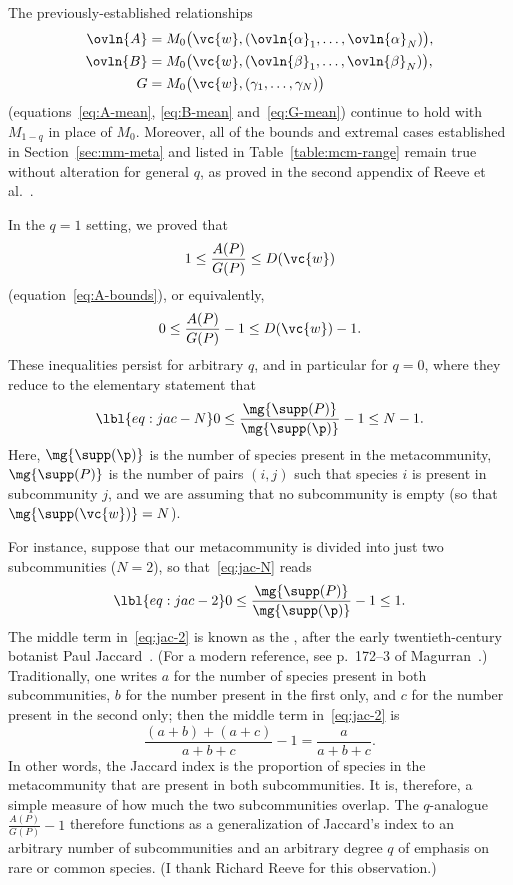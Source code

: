 The previously-established relationships
% 
\begin{align*}
\ovln{A}        &
=
M_0 \bigl( \vc{w}, 
(\ovln{\alpha}_1, \ldots, \ovln{\alpha}_N) 
\bigr),   \\
\ovln{B}        &
=
M_0 \bigl( \vc{w}, 
(\ovln{\beta}_1, \ldots, \ovln{\beta}_N) 
\bigr),     \\
G               &
=
M_0 \bigl( \vc{w}, 
(\gamma_1, \ldots, \gamma_N) 
\bigr)
\end{align*}
% 
(equations~\eqref{eq:A-mean}, \eqref{eq:B-mean} and~\eqref{eq:G-mean})
continue to hold with $M_{1 - q}$ in place of $M_0$.  Moreover, all of the
bounds and extremal cases established in Section~\ref{sec:mm-meta} and
listed in Table~\ref{table:mcm-range} remain true without alteration for
general $q$, as proved in the second appendix of Reeve et al.~\cite{HPD}.

\begin{example}
In the $q = 1$ setting, we proved that
\[
1 \leq \frac{A(P)}{G(P)} \leq D(\vc{w})
\]
(equation~\eqref{eq:A-bounds}), or equivalently,
\[
0 \leq \frac{A(P)}{G(P)} - 1 \leq D(\vc{w}) - 1.
\]
These inequalities persist for arbitrary $q$, and in
particular for $q = 0$, where they reduce to the elementary statement that
% 
\begin{equation}
\lbl{eq:jac-N}
0 \leq
\frac{\mg{\supp(P)}}{\mg{\supp(\p)}} - 1
\leq N - 1.
\end{equation}
% 
Here, $\mg{\supp(\p)}$ is the number of species present in the
metacommunity, $\mg{\supp(P)}$ is the number of pairs $(i, j)$ such that
species $i$ is present in subcommunity $j$, and we are assuming that no
subcommunity is empty (so that $\mg{\supp(\vc{w})} = N$).  

For instance, suppose that our metacommunity is divided into just two
subcommunities ($N = 2$), so that~\eqref{eq:jac-N} reads
% 
\begin{equation}
\lbl{eq:jac-2}
0 \leq
\frac{\mg{\supp(P)}}{\mg{\supp(\p)}} - 1
\leq 1.
\end{equation}
% 
The middle term in~\eqref{eq:jac-2} is known as the , after the early twentieth-century botanist Paul Jaccard~\cite{Jacc}.
(For a modern reference, see p.~\mbox{172--3} of Magurran~\cite{Magu}.)
Traditionally, one writes $a$ for the number of species present in both
subcommunities, $b$ for the number present in the first only, and $c$ for
the number present in the second only; then the middle term
in~\eqref{eq:jac-2} is
\[
\frac{(a + b) + (a + c)}{a + b + c} - 1
=
\frac{a}{a + b + c}.
\]
In other words, the Jaccard index is the proportion of species in the
metacommunity that are present in both subcommunities.  It is, therefore, a
simple measure of how much the two subcommunities overlap.  The
$q$-analogue $\frac{A(P)}{G(P)} - 1$ therefore functions as a
generalization of Jaccard's index to an arbitrary number of subcommunities
and an arbitrary degree $q$ of emphasis on rare or common species.  (I
thank Richard Reeve for this observation.)
\end{example}

